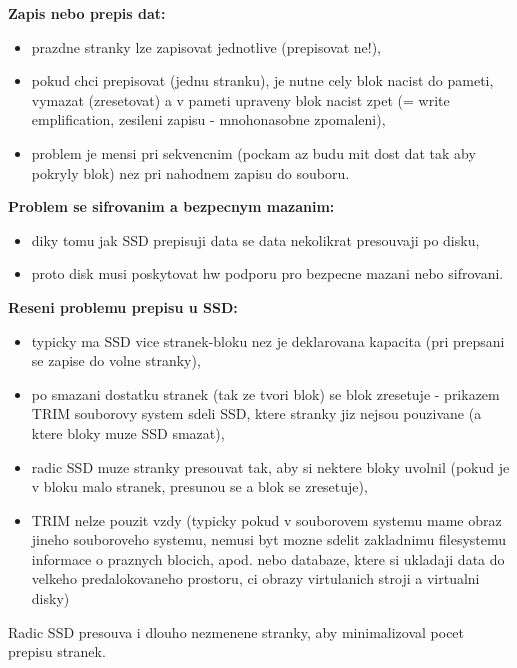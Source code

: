 \documentclass[a4paper, 11pt]{article}
\begin{document}
\noindent\textbf{Zapis nebo prepis dat:}
\begin{itemize}
    \item prazdne stranky lze zapisovat jednotlive (prepisovat ne!),
    \item pokud chci prepisovat (jednu stranku), je nutne cely blok nacist do pameti, vymazat (zresetovat) a v pameti upraveny blok nacist zpet (= write emplification, zesileni zapisu - mnohonasobne zpomaleni),
    \item problem je mensi pri sekvencnim (pockam az budu mit dost dat tak aby pokryly blok) nez pri nahodnem zapisu do souboru. \\
\end{itemize}

\noindent\textbf{Problem se sifrovanim a bezpecnym mazanim:}
\begin{itemize}
    \item diky tomu jak SSD prepisuji data se data nekolikrat presouvaji po disku,
    \item proto disk musi poskytovat hw podporu pro bezpecne mazani nebo sifrovani. \\
\end{itemize}

\noindent\textbf{Reseni problemu prepisu u SSD:}
\begin{itemize}
    \item typicky ma SSD vice stranek-bloku nez je deklarovana kapacita (pri prepsani se zapise do volne stranky),
    \item po smazani dostatku stranek (tak ze tvori blok) se blok zresetuje - prikazem TRIM souborovy system sdeli SSD, ktere stranky jiz nejsou pouzivane (a ktere bloky muze SSD smazat),
    \item radic SSD muze stranky presouvat tak, aby si nektere bloky uvolnil (pokud je v bloku malo stranek, presunou se a blok se zresetuje),
    \item TRIM nelze pouzit vzdy (typicky pokud v souborovem systemu mame obraz jineho souboroveho systemu, nemusi byt mozne sdelit zakladnimu filesystemu informace o praznych blocich, apod. nebo databaze, ktere si ukladaji data do velkeho predalokovaneho prostoru, ci obrazy virtulanich stroji a virtualni disky) \\
\end{itemize}

\noindent Radic SSD presouva i dlouho nezmenene stranky, aby minimalizoval pocet prepisu stranek. \\
\end{document}

